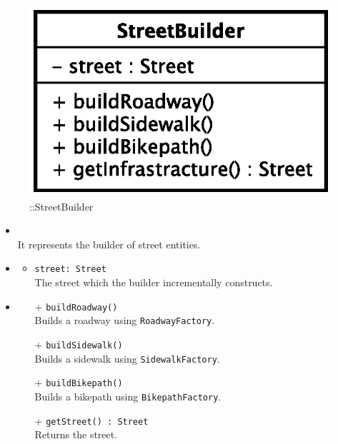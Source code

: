 \begin{figure}[h]
\centering
\includegraphics[scale=0.6,keepaspectratio]{images/solution/app/backend/street_builder.eps}
\caption{\pReactiveBuild::StreetBuilder}
\label{fig:sd-app-street_builder}
\end{figure}
\FloatBarrier
\begin{itemize}
  \item \textbf{\descr} \\
    It represents the builder of street entities.
  \item \textbf{\attrs}
  \begin{itemize}
    \item \texttt{street: Street} \\
The street which the builder incrementally constructs.
  \end{itemize}
  \item \textbf{\ops}
  \begin{itemize} 
    \item[+] \texttt{buildRoadway()} \\
Builds a roadway using \texttt{RoadwayFactory}.
    \item[+] \texttt{buildSidewalk()} \\
Builds a sidewalk using \texttt{SidewalkFactory}.
    \item[+] \texttt{buildBikepath()} \\
Builds a bikepath using \texttt{BikepathFactory}.
    \item[+] \texttt{getStreet() : Street} \\
Returns the street.
  \end{itemize}
\end{itemize}
